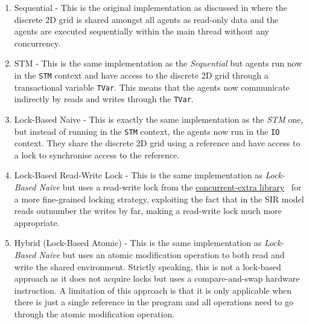 \begin{enumerate}
	\item Sequential - This is the original implementation as discussed in \cite{thaler_pure_2018} where the discrete 2D grid is shared amongst all agents as read-only data and the agents are executed sequentially within the main thread without any concurrency.
	
	\item STM - This is the same implementation as the \textit{Sequential} but agents run now in the \texttt{STM} context and have access to the discrete 2D grid through a transactional variable \texttt{TVar}. This means that the agents now communicate indirectly by reads and writes through the \texttt{TVar}.
		
	\item Lock-Based Naive - This is exactly the same implementation as the \textit{STM} one, but instead of running in the \texttt{STM} context, the agents now run in the \texttt{IO} context. They share the discrete 2D grid using a reference and have access to a lock to synchronise access to the reference.

	\item Lock-Based Read-Write Lock - This is the same implementation as \textit{Lock-Based Naive} but uses a read-write lock from the \href{http://hackage.haskell.org/package/concurrent-extra}{concurrent-extra library}~\cite{concurrent_extra_library} for a more fine-grained locking strategy, exploiting the fact that in the SIR model reads outnumber the writes by far, making a read-write lock much more appropriate.

	
	\item Hybrid (Lock-Based Atomic) - This is the same implementation as \textit{Lock-Based Naive} but uses an atomic modification operation to both read and write the shared environment. Strictly speaking, this is not a lock-based approach as it does not acquire locks but uses a compare-and-swap hardware instruction. A limitation of this approach is that it is only applicable when there is just a single reference in the program and all operations need to go through the atomic modification operation.
	
\end{enumerate}

